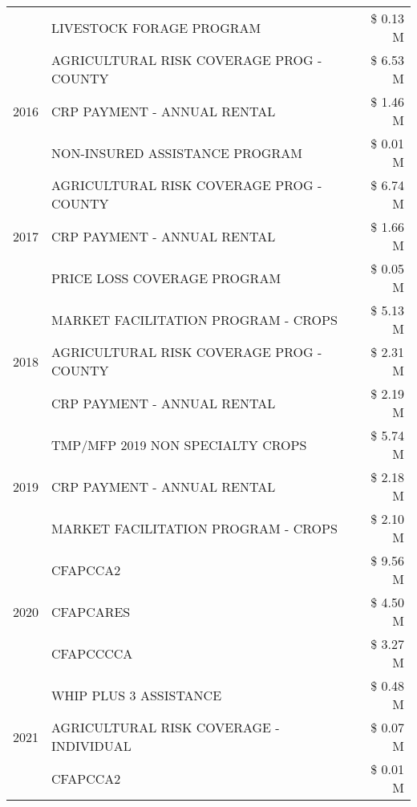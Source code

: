 \begin{tabular}{llr}
 & LIVESTOCK FORAGE PROGRAM & \$ 0.13 M \\
\cline{1-3}
\multirow[t]{3}{*}{2016} & AGRICULTURAL RISK COVERAGE PROG - COUNTY & \$ 6.53 M \\
 & CRP PAYMENT - ANNUAL RENTAL & \$ 1.46 M \\
 & NON-INSURED ASSISTANCE PROGRAM & \$ 0.01 M \\
\cline{1-3}
\multirow[t]{3}{*}{2017} & AGRICULTURAL RISK COVERAGE PROG - COUNTY & \$ 6.74 M \\
 & CRP PAYMENT - ANNUAL RENTAL & \$ 1.66 M \\
 & PRICE LOSS COVERAGE PROGRAM & \$ 0.05 M \\
\cline{1-3}
\multirow[t]{3}{*}{2018} & MARKET FACILITATION PROGRAM - CROPS & \$ 5.13 M \\
 & AGRICULTURAL RISK COVERAGE PROG - COUNTY & \$ 2.31 M \\
 & CRP PAYMENT - ANNUAL RENTAL & \$ 2.19 M \\
\cline{1-3}
\multirow[t]{3}{*}{2019} & TMP/MFP 2019 NON SPECIALTY CROPS & \$ 5.74 M \\
 & CRP PAYMENT - ANNUAL RENTAL & \$ 2.18 M \\
 & MARKET FACILITATION PROGRAM - CROPS & \$ 2.10 M \\
\cline{1-3}
\multirow[t]{3}{*}{2020} & CFAPCCA2 & \$ 9.56 M \\
 & CFAPCARES & \$ 4.50 M \\
 & CFAPCCCCA & \$ 3.27 M \\
\cline{1-3}
\multirow[t]{3}{*}{2021} & WHIP PLUS 3 ASSISTANCE & \$ 0.48 M \\
 & AGRICULTURAL RISK COVERAGE - INDIVIDUAL & \$ 0.07 M \\
 & CFAPCCA2 & \$ 0.01 M \\
\cline{1-3}
\bottomrule
\end{tabular}
